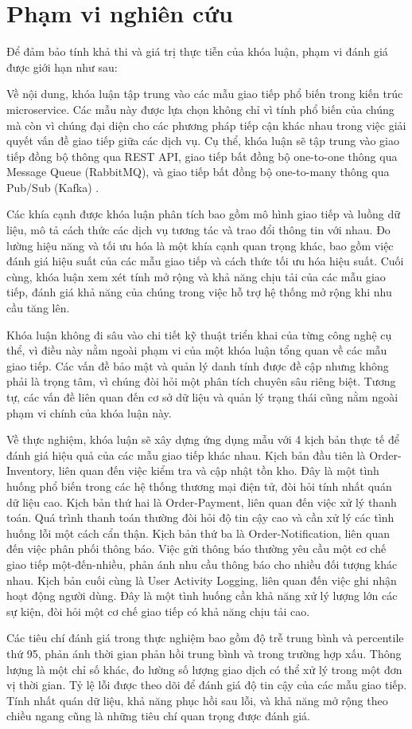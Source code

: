 \section{Phạm vi nghiên cứu}
Để đảm bảo tính khả thi và giá trị thực tiễn của khóa luận, phạm vi đánh giá được giới hạn như sau:

Về nội dung, khóa luận tập trung vào các mẫu giao tiếp phổ biến trong kiến trúc microservice. Các mẫu này được lựa chọn không chỉ vì tính phổ biến của chúng mà còn vì chúng đại diện cho các phương pháp tiếp cận khác nhau trong việc giải quyết vấn đề giao tiếp giữa các dịch vụ. Cụ thể, khóa luận sẽ tập trung vào giao tiếp đồng bộ thông qua REST API, giao tiếp bất đồng bộ one-to-one thông qua Message Queue (RabbitMQ), và giao tiếp bất đồng bộ one-to-many thông qua Pub/Sub (Kafka) \cite{aksakalli2021}.

Các khía cạnh được khóa luận phân tích bao gồm mô hình giao tiếp và luồng dữ liệu, mô tả cách thức các dịch vụ tương tác và trao đổi thông tin với nhau. Đo lường hiệu năng và tối ưu hóa là một khía cạnh quan trọng khác, bao gồm việc đánh giá hiệu suất của các mẫu giao tiếp và cách thức tối ưu hóa hiệu suất. Cuối cùng, khóa luận xem xét tính mở rộng và khả năng chịu tải của các mẫu giao tiếp, đánh giá khả năng của chúng trong việc hỗ trợ hệ thống mở rộng khi nhu cầu tăng lên.

Khóa luận không đi sâu vào chi tiết kỹ thuật triển khai của từng công nghệ cụ thể, vì điều này nằm ngoài phạm vi của một khóa luận tổng quan về các mẫu giao tiếp. Các vấn đề bảo mật và quản lý danh tính được đề cập nhưng không phải là trọng tâm, vì chúng đòi hỏi một phân tích chuyên sâu riêng biệt. Tương tự, các vấn đề liên quan đến cơ sở dữ liệu và quản lý trạng thái cũng nằm ngoài phạm vi chính của khóa luận này.

Về thực nghiệm, khóa luận sẽ xây dựng ứng dụng mẫu với 4 kịch bản thực tế để đánh giá hiệu quả của các mẫu giao tiếp khác nhau. Kịch bản đầu tiên là Order-Inventory, liên quan đến việc kiểm tra và cập nhật tồn kho. Đây là một tình huống phổ biến trong các hệ thống thương mại điện tử, đòi hỏi tính nhất quán dữ liệu cao. Kịch bản thứ hai là Order-Payment, liên quan đến việc xử lý thanh toán. Quá trình thanh toán thường đòi hỏi độ tin cậy cao và cần xử lý các tình huống lỗi một cách cẩn thận. Kịch bản thứ ba là Order-Notification, liên quan đến việc phân phối thông báo. Việc gửi thông báo thường yêu cầu một cơ chế giao tiếp một-đến-nhiều, phản ánh nhu cầu thông báo cho nhiều đối tượng khác nhau. Kịch bản cuối cùng là User Activity Logging, liên quan đến việc ghi nhận hoạt động người dùng. Đây là một tình huống cần khả năng xử lý lượng lớn các sự kiện, đòi hỏi một cơ chế giao tiếp có khả năng chịu tải cao.

Các tiêu chí đánh giá trong thực nghiệm bao gồm độ trễ trung bình và percentile thứ 95, phản ánh thời gian phản hồi trung bình và trong trường hợp xấu. Thông lượng là một chỉ số khác, đo lường số lượng giao dịch có thể xử lý trong một đơn vị thời gian. Tỷ lệ lỗi được theo dõi để đánh giá độ tin cậy của các mẫu giao tiếp. Tính nhất quán dữ liệu, khả năng phục hồi sau lỗi, và khả năng mở rộng theo chiều ngang cũng là những tiêu chí quan trọng được đánh giá. 